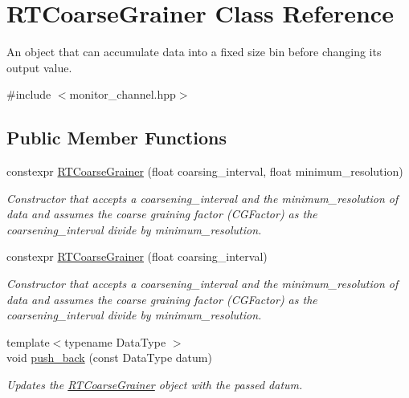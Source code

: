 \hypertarget{classRTCoarseGrainer}{}\section{R\+T\+Coarse\+Grainer Class Reference}
\label{classRTCoarseGrainer}


An object that can accumulate data into a fixed size bin before changing its output value.  




{\ttfamily \#include $<$monitor\+\_\+channel.\+hpp$>$}

\subsection*{Public Member Functions}
\begin{DoxyCompactItemize}
\item 
constexpr \hyperlink{classRTCoarseGrainer_a67187c9ba3d8142c23379392dec4e35d}{R\+T\+Coarse\+Grainer} (float coarsing\+\_\+interval, float minimum\+\_\+resolution)
\begin{DoxyCompactList}\small\item\em Constructor that accepts a {\ttfamily coarsening\+\_\+interval} and the {\ttfamily minimum\+\_\+resolution} of data and assumes the coarse graining factor ({\ttfamily C\+G\+Factor}) as the {\ttfamily coarsening\+\_\+interval} divide by {\ttfamily minimum\+\_\+resolution}. \end{DoxyCompactList}\item 
constexpr \hyperlink{classRTCoarseGrainer_af46c3757bdda8ce79f8655d5556d845b}{R\+T\+Coarse\+Grainer} (float coarsing\+\_\+interval)
\begin{DoxyCompactList}\small\item\em Constructor that accepts a {\ttfamily coarsening\+\_\+interval} and the {\ttfamily minimum\+\_\+resolution} of data and assumes the coarse graining factor ({\ttfamily C\+G\+Factor}) as the {\ttfamily coarsening\+\_\+interval} divide by {\ttfamily minimum\+\_\+resolution}. \end{DoxyCompactList}\item 
{\footnotesize template$<$typename Data\+Type $>$ }\\void \hyperlink{classRTCoarseGrainer_a92ba58efd22b7c3c9e79cd4d5e065e70}{push\+\_\+back} (const Data\+Type datum)
\begin{DoxyCompactList}\small\item\em Updates the {\ttfamily \hyperlink{classRTCoarseGrainer}{R\+T\+Coarse\+Grainer}} object with the passed datum. \end{DoxyCompactList}\item 

\end{DoxyCompactItemize}
